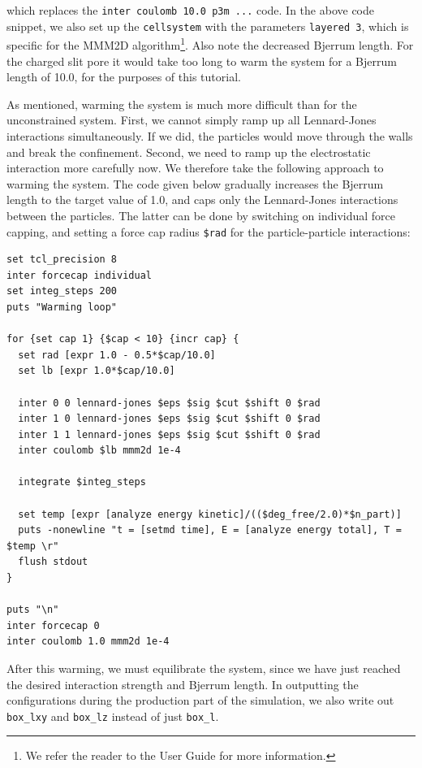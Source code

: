 \documentclass[
a4paper,                        %
11pt,                           %
twoside,                        %
footsepline,                    %
headsepline,                    %
headexclude,                    %
footexclude,                    %
pagesize,                       %
]{scrartcl}
\begin{document}
\noindent which replaces the \verb|inter coulomb 10.0 p3m ...| code. In the above code snippet, we also set up the \verb|cellsystem| with the parameters \texttt{layered 3}, which is specific for the MMM2D algorithm\footnote{We refer the reader to the User Guide for more information.}. Also note the decreased Bjerrum length. For the charged slit pore it would take too long to warm the system for a Bjerrum length of 10.0, for the purposes of this tutorial.

As mentioned, warming the system is much more difficult than for the unconstrained system. First, we cannot simply ramp up all Lennard-Jones interactions simultaneously. If we did, the particles would move through the walls and break the confinement. Second, we need to ramp up the electrostatic interaction more carefully now. We therefore take the following approach to warming the system. The code given below gradually increases the Bjerrum length to the target value of 1.0, and caps only the Lennard-Jones interactions between the particles. The latter can be done by switching on individual force capping, and setting a force cap radius \verb|$rad| for the particle-particle interactions:

{\small\vspace{0,2cm}
\begin{lstlisting}[numbers=none]
set tcl_precision 8
inter forcecap individual
set integ_steps 200
puts "Warming loop"

for {set cap 1} {$cap < 10} {incr cap} {
  set rad [expr 1.0 - 0.5*$cap/10.0]
  set lb [expr 1.0*$cap/10.0]

  inter 0 0 lennard-jones $eps $sig $cut $shift 0 $rad
  inter 1 0 lennard-jones $eps $sig $cut $shift 0 $rad
  inter 1 1 lennard-jones $eps $sig $cut $shift 0 $rad
  inter coulomb $lb mmm2d 1e-4

  integrate $integ_steps

  set temp [expr [analyze energy kinetic]/(($deg_free/2.0)*$n_part)]
  puts -nonewline "t = [setmd time], E = [analyze energy total], T = $temp \r"
  flush stdout
}

puts "\n"
inter forcecap 0
inter coulomb 1.0 mmm2d 1e-4
\end{lstlisting}\vspace{0,2cm}
}

\noindent After this warming, we must equilibrate the system, since we have just reached the desired interaction strength and Bjerrum length. In outputting the configurations during the production part of the simulation, we also write out \verb|box_lxy| and \verb|box_lz| instead of just \verb|box_l|.
\end{document}
